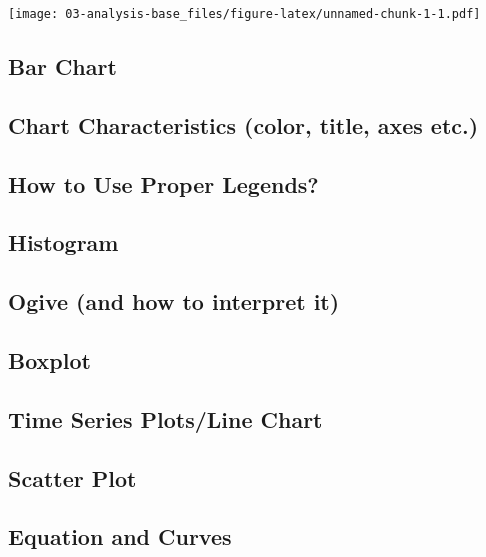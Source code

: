 \documentclass[
]{book}
\begin{document}
\texttt{[image: 03-analysis-base\_files/figure-latex/unnamed-chunk-1-1.pdf]}

\hypertarget{bar-chart}{%
\subsection{Bar Chart}\label{bar-chart}}

\hypertarget{chart-characteristics-color-title-axes-etc.}{%
\subsection{Chart Characteristics (color, title, axes etc.)}\label{chart-characteristics-color-title-axes-etc.}}

\hypertarget{how-to-use-proper-legends}{%
\subsection{How to Use Proper Legends?}\label{how-to-use-proper-legends}}

\hypertarget{histogram}{%
\subsection{Histogram}\label{histogram}}

\hypertarget{ogive-and-how-to-interpret-it}{%
\subsection{Ogive (and how to interpret it)}\label{ogive-and-how-to-interpret-it}}

\hypertarget{boxplot}{%
\subsection{Boxplot}\label{boxplot}}

\hypertarget{time-series-plotsline-chart}{%
\subsection{Time Series Plots/Line Chart}\label{time-series-plotsline-chart}}

\hypertarget{scatter-plot}{%
\subsection{Scatter Plot}\label{scatter-plot}}

\hypertarget{equation-and-curves}{%
\subsection{Equation and Curves}\label{equation-and-curves}}
\end{document}
